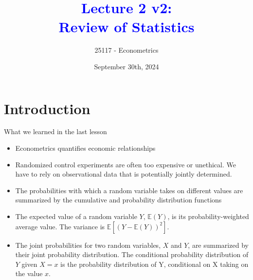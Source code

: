 \documentclass[notes,10pt, aspectratio=169]{beamer}
\title[]{\textcolor{blue}{Lecture 2 v2:\\Review of Statistics}}
\author{25117 - Econometrics}
\institute[shortinst]{Universitat Pompeu Fabra}
\date{September 30th, 2024}
\begin{document}

\begin{frame}[plain]
\maketitle
\end{frame}

\section{Introduction}

\begin{frame}{What we learned in the last lesson}
\begin{itemize}
    \item Econometrics quantifies economic relationships 
    \item Randomized control experiments are often too expensive or unethical. We have to rely on observational data that is potentially jointly determined.
    \item The probabilities with which a random variable takes on different values are summarized by the cumulative and probability distribution functions
    \item The expected value of a random variable $Y$, $\mathbb{E}(Y)$, is its probability-weighted average value. The variance is $\mathbb{E}[(Y-\mathbb{E}(Y))^2]$.
    \item The joint probabilities for two random variables, $X$ and $Y$, are summarized by their joint probability distribution. The conditional probability distribution of $Y$ given $X = x$ is the probability distribution of Y, conditional on X taking on the value $x$.
\end{itemize}
\end{frame}
\end{document}
